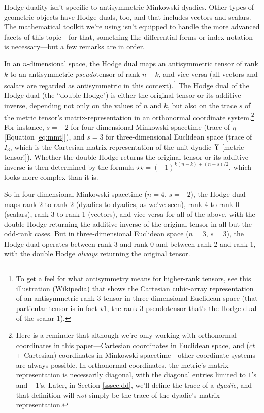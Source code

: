 \documentclass[12pt]{article}
\newcommand{\tightoverset}[2]{%
  \mathop{#2}\limits^{\vbox to -.5ex{\kern-0.75ex\hbox{$#1$}\vss}}}
\newcommand{\inlinedy}[1]{\tightoverset{\text{\tiny$\bm\leftrightarrow$}}{#1}}
\begin{document}
Hodge duality isn't specific to antisymmetric Minkowski dyadics. Other types of geometric objects have Hodge duals, too, and that includes vectors and scalars. The mathematical toolkit we're using isn't equipped to handle the more advanced facets of this topic---for that, something like differential forms or index notation is necessary---but a few remarks are in order.

In an $n$-dimensional space, the Hodge dual maps an antisymmetric tensor of rank $k$ to an antisymmetric \emph{pseudo}tensor of rank $n - k$, and vice versa (all vectors and scalars are regarded as antisymmetric in this context).\footnote{To get a feel for what antisymmetry means for higher-rank tensors, see \href{https://en.wikipedia.org/wiki/Levi-Civita_symbol\#/media/File:Epsilontensor.svg}{this illustration} (Wikipedia) that shows the Cartesian cubic-array representation of an antisymmetric rank-3 tensor in three-dimensional Euclidean space (that particular tensor is in fact $\star 1$, the rank-3 pseudotensor that's the Hodge dual of the scalar $1$).} The Hodge dual of the Hodge dual (the ``double Hodge") is either the original tensor or its additive inverse, depending not only on the values of $n$ and $k$, but also on the trace $s$ of the metric tensor's matrix-representation in an orthonormal coordinate system.\footnote{Here is a reminder that although we're only working with orthonormal coordinates in this paper---Cartesian coordinates in Euclidean space, and ($ct$ + Cartesian) coordinates in Minkowski spacetime---other coordinate systems are always possible. In orthonormal coordinates, the metric's matrix-representation is necessarily diagonal, with the diagonal entries limited to $1$'s and $-1$'s. Later, in Section \ref{sssec:dd}, we'll define the trace of a \emph{dyadic}, and that definition will \emph{not} simply be the trace of the dyadic's matrix representation.} For instance, $s = -2$ for four-dimensional Minkowski spacetime (trace of $\eta$ [Equation \ref{eq:mmt}]), and $s = 3$ for three-dimensional Euclidean space (trace of $I_3$, which is the Cartesian matrix representation of the unit dyadic $\inlinedy{\upiota}$ [metric tensor!]). Whether the double Hodge returns the original tensor or its additive inverse is then determined by the formula $\star \star = (-1)^{k(n-k) + (n-s)/2}$, which looks more complex than it is.

So in four-dimensional Minkowski spacetime ($n = 4$, $s = -2$), the Hodge dual maps rank-2 to rank-2 (dyadics to dyadics, as we've seen), rank-4 to rank-0 (scalars), rank-3 to rank-1 (vectors), and vice versa for all of the above, with the double Hodge returning the additive inverse of the original tensor in all but the odd-rank cases. But in three-dimensional Euclidean space ($n = 3$, $s = 3$), the Hodge dual operates between rank-3 and rank-0 and between rank-2 and rank-1, with the double Hodge \emph{always} returning the original tensor.
\end{document}
